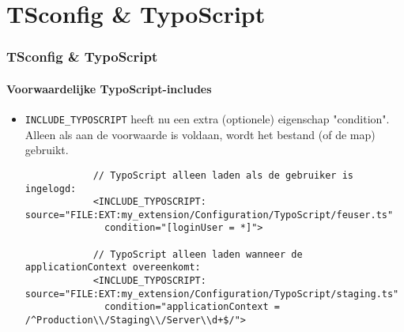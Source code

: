 %

\section{TSconfig \& TypoScript}

\begin{frame}[fragile]
	\frametitle{TSconfig \& TypoScript}
	\framesubtitle{Voorwaardelijke TypoScript-includes}

	\lstset{basicstyle=\tiny\ttfamily}

	\begin{itemize}

		\item \texttt{INCLUDE\_TYPOSCRIPT} heeft nu een extra (optionele) eigenschap "condition". 
			Alleen als aan de voorwaarde is voldaan, wordt het bestand (of de map) gebruikt.

		\begin{lstlisting}
			// TypoScript alleen laden als de gebruiker is ingelogd:
			<INCLUDE_TYPOSCRIPT: source="FILE:EXT:my_extension/Configuration/TypoScript/feuser.ts"
			  condition="[loginUser = *]">

			// TypoScript alleen laden wanneer de applicationContext overeenkomt:
			<INCLUDE_TYPOSCRIPT: source="FILE:EXT:my_extension/Configuration/TypoScript/staging.ts"
			  condition="applicationContext = /^Production\\/Staging\\/Server\\d+$/">
		\end{lstlisting}

	\end{itemize}

\end{frame}

